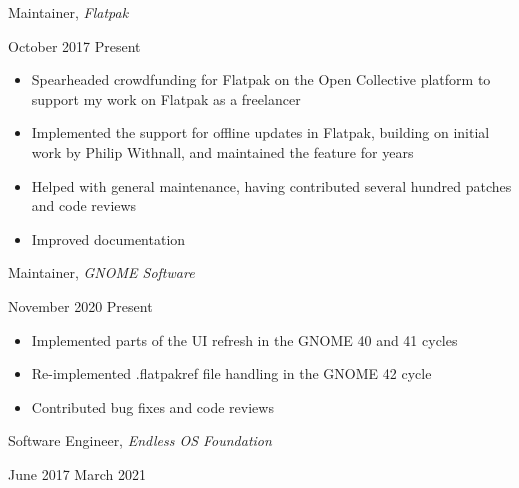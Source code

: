 \documentclass[11pt]{article}
\begin{document}
\begin{minipage}[t]{0.65\textwidth}
\flushleft
Maintainer, \textit{Flatpak}\\
\end{minipage}
\begin{minipage}[t]{0.30\textwidth}
\flushright
October 2017 \space \textemdash \space Present\\
\end{minipage}

\begin{itemize}
  \item Spearheaded crowdfunding for Flatpak on the Open Collective platform to support my work on Flatpak as a freelancer
  \item Implemented the support for offline updates in Flatpak, building on initial work by Philip Withnall, and maintained the feature for years
  \item Helped with general maintenance, having contributed several hundred patches and code reviews
  \item Improved documentation
\end{itemize}

\begin{minipage}[t]{0.65\textwidth}
\flushleft
Maintainer, \textit{GNOME Software}\\
\end{minipage}
\begin{minipage}[t]{0.30\textwidth}
\flushright
November 2020 \space \textemdash \space Present\\
\end{minipage}

\begin{itemize}
  \item Implemented parts of the UI refresh in the GNOME 40 and 41 cycles
  \item Re-implemented .flatpakref file handling in the GNOME 42 cycle
  \item Contributed bug fixes and code reviews
\end{itemize}

\begin{minipage}[t]{0.65\textwidth}
\flushleft
Software Engineer, \textit{Endless OS Foundation}\\
\end{minipage}
\begin{minipage}[t]{0.30\textwidth}
\flushright
June 2017 \space \textemdash \space March 2021\\
\end{minipage}
\end{document}
